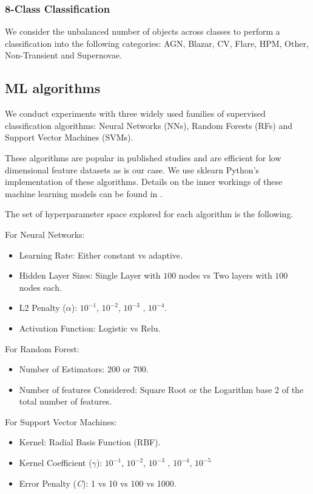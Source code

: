 \documentclass[a4paper,fleqn,usenatbib]{mnras}
\begin{document}
\subsubsection{8-Class Classification}

We consider the unbalanced number of objects across classes to 
perform a classification into the following categories:
AGN, Blazar, CV, Flare, HPM, Other, Non-Transient and Supernovae.   


\subsection{ML algorithms}


We conduct experiments with three widely used families of supervised classification 
algorithms: Neural Networks (NNs), Random Forests (RFs) and Support
Vector Machines (SVMs). 

These algorithms are popular in published studies and are efficient 
for low dimensional feature datasets as is our case. 
We use sklearn \citep{1201.0490} Python's implementation of these algorithms.
Details on the inner workings of these machine learning models can be
found in \cite{9780387848570}.  

The set of hyperparameter space explored for each algorithm is the
following. 

For Neural Networks:
\begin{itemize}
    \item Learning Rate: Either constant vs adaptive.
    \item Hidden Layer Sizes: Single Layer with $100$ nodes vs Two layers with
    $100$ nodes each.
    \item L2 Penalty ($\alpha$): 
      $10^{-1}$, $10^{-2}$, $10^{-3}$ , $10^{-4}$.
    \item Activation Function: Logistic vs Relu.
\end{itemize}

For Random Forest:
\begin{itemize}
    \item Number of Estimators: $200$ or $700$.
    \item Number of features Considered: Square Root or the Logarithm 
    base 2 of the total number of features.
\end{itemize}

For Support Vector Machines:
\begin{itemize}
    \item Kernel: Radial Basis Function (RBF).
    \item Kernel Coefficient ($\gamma$):  
      $10^{-1}$, $10^{-2}$, $10^{-3}$ , $10^{-4}$, $10^{-5}$
    \item Error Penalty (\textit{C}): 1 vs 10 vs 100 vs 1000. 
\end{itemize}
\end{document}
